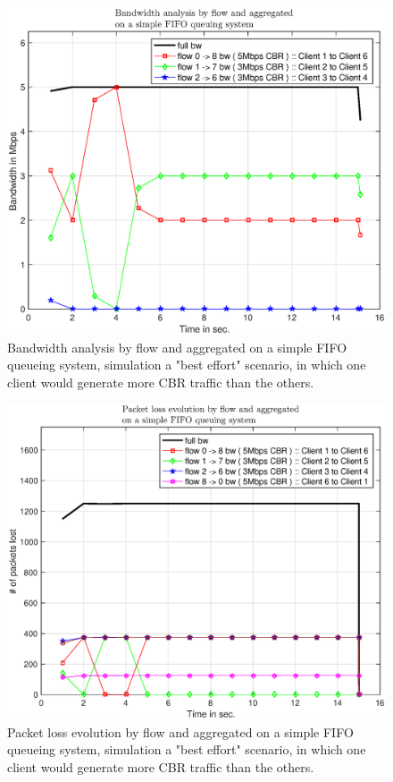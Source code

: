 \documentclass[conference,compsoc]{IEEEtran}
\begin{document}
     \begin{figure}[H]
     \centering
     \includegraphics[width=1\columnwidth]{EPS/A/bw_a3.eps}
     \caption{Bandwidth analysis by flow and aggregated on a simple FIFO queueing system, simulation a "best effort" scenario,  in which one client would generate more CBR traffic than the others.}
     \label{graph:bw_a3}
     \end{figure}


     \begin{figure}[H]
     \centering
     \includegraphics[width=1\columnwidth]{EPS/A/loss_a3.eps}
     \caption{Packet loss evolution by flow and aggregated on a simple FIFO queueing system, simulation a "best effort" scenario,  in which one client would generate more CBR traffic than the others.}\label{graph:loss_a3}
     \end{figure}
\end{document}
